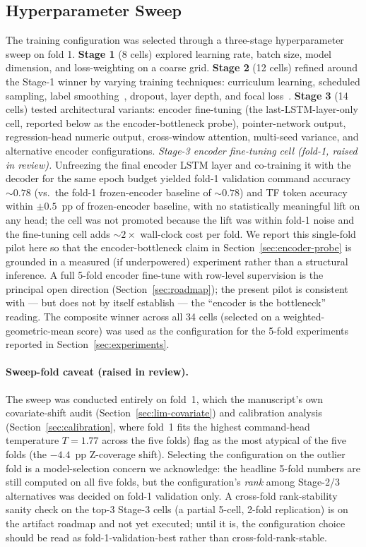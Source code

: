 \documentclass[sensors,article,submit,moreauthors,pdftex]{Definitions/mdpi}
\begin{document}
\subsection{Hyperparameter Sweep}
\label{sec:hp-sweep}

The training configuration was selected through a three-stage hyperparameter sweep on fold 1.
\textbf{Stage 1} (8 cells) explored learning rate, batch size, model dimension, and loss-weighting on a coarse grid.
\textbf{Stage 2} (12 cells) refined around the Stage-1 winner by varying training techniques: curriculum learning, scheduled sampling, label smoothing~\cite{szegedy2016inception}, dropout, layer depth, and focal loss~\cite{focal_loss}.
\textbf{Stage 3} (14 cells) tested architectural variants: encoder fine-tuning (the last-LSTM-layer-only cell, reported below as the encoder-bottleneck probe), pointer-network output, regression-head numeric output, cross-window attention, multi-seed variance, and alternative encoder configurations. \emph{Stage-3 encoder fine-tuning cell (fold-1, raised in review).} Unfreezing the final encoder LSTM layer and co-training it with the decoder for the same epoch budget yielded fold-1 validation command accuracy $\sim\!0.78$ (vs.\ the fold-1 frozen-encoder baseline of $\sim\!0.78$) and TF token accuracy within $\pm 0.5$~pp of frozen-encoder baseline, with no statistically meaningful lift on any head; the cell was not promoted because the lift was within fold-1 noise and the fine-tuning cell adds $\sim 2\times$ wall-clock cost per fold. We report this single-fold pilot here so that the encoder-bottleneck claim in Section~\ref{sec:encoder-probe} is grounded in a measured (if underpowered) experiment rather than a structural inference. A full 5-fold encoder fine-tune with row-level supervision is the principal open direction (Section~\ref{sec:roadmap}); the present pilot is consistent with --- but does not by itself establish --- the ``encoder is the bottleneck'' reading.
The composite winner across all 34 cells (selected on a weighted-geometric-mean score) was used as the configuration for the 5-fold experiments reported in Section~\ref{sec:experiments}. \paragraph{Sweep-fold caveat (raised in review).} The sweep was conducted entirely on fold~1, which the manuscript's own covariate-shift audit (Section~\ref{sec:lim-covariate}) and calibration analysis (Section~\ref{sec:calibration}, where fold~1 fits the highest command-head temperature $T\!=\!1.77$ across the five folds) flag as the most atypical of the five folds (the $-4.4$~pp Z-coverage shift). Selecting the configuration on the outlier fold is a model-selection concern we acknowledge: the headline 5-fold numbers are still computed on all five folds, but the configuration's \emph{rank} among Stage-2/3 alternatives was decided on fold-1 validation only. A cross-fold rank-stability sanity check on the top-3 Stage-3 cells (a partial 5-cell, 2-fold replication) is on the artifact roadmap and not yet executed; until it is, the configuration choice should be read as fold-1-validation-best rather than cross-fold-rank-stable.
\end{document}
